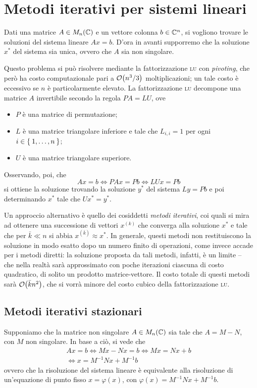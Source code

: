 \chapter{Metodi iterativi per sistemi lineari}

	\noindent Dati una matrice \(A \in M_n (\mathbb{C})\) e un vettore colonna \(b \in \mathbb{C}^n\), si vogliono trovare le soluzioni del sistema lineare \(A x = b\). D'ora in avanti supporremo che la soluzione \(x^*\) del sistema sia unica, ovvero che \(A\) sia non singolare.
	
	Questo problema si può risolvere mediante la fattorizzazione \textsc{lu} con \emph{pivoting}, che però ha costo computazionale pari a \(\order{n^3 / 3}\) moltiplicazioni; un tale costo è eccessivo se \(n\) è particolarmente elevato. La fattorizzazione \textsc{lu} decompone una matrice \(A\) invertibile secondo la regola \(P \! A = L U\), ove
		\begin{itemize}
			\item \(P\) è una matrice di permutazione;
			\item \(L\) è una matrice triangolare inferiore e tale che \(L_{i, i} = 1\) per ogni \(i \in \Set{1, \dots, n}\);
			\item \(U\) è una matrice triangolare superiore.
		\end{itemize}
	Osservando, poi, che
	\begin{equation*}
		A x = b \iff P \! A x = P b \iff L U x = P b
	\end{equation*}
	si ottiene la soluzione trovando la soluzione \(y^*\) del sistema \(L y = P b\) e poi determinando \(x^*\) tale che \(U x^* = y^*\).
	
	Un approccio alternativo è quello dei cosiddetti \emph{metodi iterativi}, coi quali si mira ad ottenere una successione di vettori \(x^{(k)}\) che converga alla soluzione \(x^*\) e tale che per \(\bar{k} \ll n\) si abbia \(x^{(\bar{k})} \approx x^*\). In generale, questi metodi non restituiscono la soluzione in modo esatto dopo un numero finito di operazioni, come invece accade per i metodi diretti: la soluzione proposta da tali metodi, infatti, è un limite -- che nella realtà sarà approssimato con poche iterazioni ciascuna di costo quadratico, di solito un prodotto matrice-vettore. Il costo totale di questi metodi sarà \(\order{\bar{k} n^2}\), che si vorrà minore del costo cubico della fattorizzazione \textsc{lu}.
	
\section{Metodi iterativi stazionari}
	
	\noindent Supponiamo che la matrice non singolare \(A \in M_n (\mathbb{C})\) sia tale che \(A = M - N\), con \(M\) non singolare. In base a ciò, si vede che
	\begin{multline*}
		A x = b \iff M x - N x = b \iff M x = N x + b \\
		\iff x = M^{-1} N x + M^{-1} b
	\end{multline*}
	ovvero che la risoluzione del sistema lineare è equivalente alla risoluzione di un'equazione di punto fisso \(x = \varphi (x)\), con \(\varphi (x) = M^{-1} N x + M^{-1} b\).